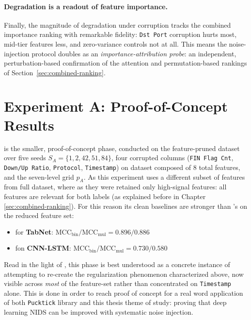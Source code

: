 \documentclass[../main.tex]{subfiles}
\begin{document}
\paragraph{Degradation is a readout of feature importance.}
Finally, the magnitude of degradation under corruption tracks the combined importance ranking with remarkable fidelity: \texttt{Dst Port} corruption hurts most, mid-tier features less, and zero-variance controls not at all. This means the noise-injection protocol doubles as an \emph{importance-attribution probe}: an independent, perturbation-based confirmation of the attention and permutation-based rankings of Section~\ref{sec:combined-ranking}.

\newpage
\section{Experiment A: Proof-of-Concept Results}
\label{sec:res-A}

 is the smaller, proof-of-concept phase, conducted on the feature-pruned dataset over five seeds $S_A = \{1, 2, 42, 51, 84\}$, four corrupted columns (\texttt{FIN Flag Cnt}, \texttt{Down/Up Ratio}, \texttt{Protocol}, \texttt{Timestamp}) on dataset composed of 8 total features, and the seven-level grid $p_A$. As this experiment uses a different subset of features from full dataset, where as they were retained only high-signal features: all features are relevant for both labels (as explained before in Chapter \ref{sec:combined-ranking}). For this reason its clean baselines are stronger than 's on the reduced feature set:
\begin{itemize}
    \item for \textbf{TabNet}: $\mathrm{MCC}_{\text{bin}}/\mathrm{MCC}_{\text{mul}} = 0.896/0.886$
    \item fon \textbf{CNN-LSTM}: $\mathrm{MCC}_{\text{bin}}/\mathrm{MCC}_{\text{mul}} = 0.730/0.580$ 
\end{itemize}
Read in the light of , this phase is best understood as a concrete instance of attempting to re-create the regularization phenomenon characterized above, now visible across \emph{most} of the feature-set rather than concentrated on \texttt{Timestamp} alone. This is done in order to reach proof of concept for a real word application of both \texttt{Pucktick} library and this thesis theme of study: proving that deep learning NIDS can be improved with systematic noise injection. 
\end{document}
